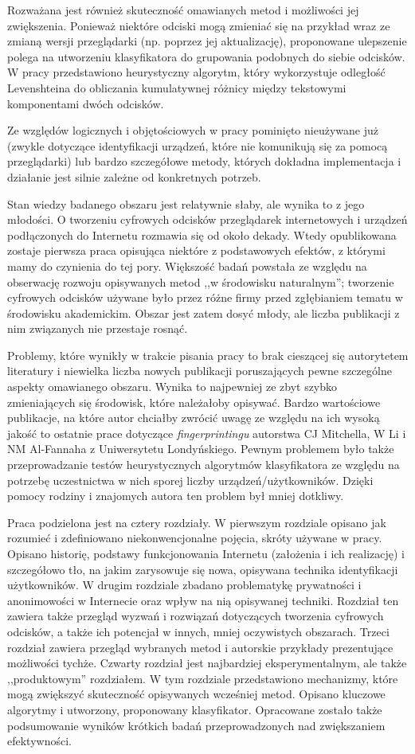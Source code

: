 Rozważana jest również skuteczność omawianych metod i możliwości jej
zwiększenia. Ponieważ niektóre odciski mogą zmieniać się na przykład wraz ze
zmianą wersji przeglądarki (np. poprzez jej aktualizację), proponowane
ulepszenie polega na utworzeniu klasyfikatora do grupowania podobnych do siebie
odcisków. W pracy przedstawiono heurystyczny algorytm, który wykorzystuje
odległość Levenshteina do obliczania kumulatywnej różnicy między tekstowymi
komponentami dwóch odcisków.

Ze względów logicznych i objętościowych w pracy pominięto nieużywane już (zwykle
dotyczące identyfikacji urządzeń, które nie komunikują się za pomocą
przeglądarki) lub bardzo szczegółowe metody, których dokładna implementacja i
działanie jest silnie zależne od konkretnych potrzeb.

Stan wiedzy badanego obszaru jest relatywnie słaby, ale wynika to z jego
młodości. O tworzeniu cyfrowych odcisków przeglądarek internetowych i urządzeń
podłączonych do Internetu rozmawia się od około dekady. Wtedy opublikowana
zostaje pierwsza praca opisująca niektóre z podstawowych efektów, z którymi mamy
do czynienia do tej pory. Większość badań powstała ze względu na obserwację
rozwoju opisywanych metod ,,w środowisku naturalnym''; tworzenie cyfrowych
odcisków używane było przez różne firmy przed zgłębianiem tematu w środowisku
akademickim. Obszar jest zatem dosyć młody, ale liczba publikacji z nim
związanych nie przestaje rosnąć.

Problemy, które wynikły w trakcie pisania pracy to brak cieszącej się
autorytetem literatury i niewielka liczba nowych publikacji poruszających pewne
szczególne aspekty omawianego obszaru. Wynika to najpewniej ze zbyt szybko
zmieniających się środowisk, które należałoby opisywać. Bardzo wartościowe
publikacje, na które autor chciałby zwrócić uwagę ze względu na ich wysoką
jakość to ostatnie prace dotyczące \emph{fingerprintingu} autorstwa CJ
Mitchella, W Li i NM Al-Fannaha z Uniwersytetu Londyńskiego. Pewnym problemem
było także przeprowadzanie testów heurystycznych algorytmów klasyfikatora ze
względu na potrzebę uczestnictwa w nich sporej liczby urządzeń/użytkowników.
Dzięki pomocy rodziny i znajomych autora ten problem był mniej dotkliwy.

Praca podzielona jest na cztery rozdziały. W pierwszym rozdziale opisano jak
rozumieć i zdefiniowano niekonwencjonalne pojęcia, skróty używane w pracy.
Opisano historię, podstawy funkcjonowania Internetu (założenia i ich realizację)
i szczegółowo tło, na jakim zarysowuje się nowa, opisywana technika
identyfikacji użytkowników. W drugim rozdziale zbadano problematykę prywatności
i anonimowości w Internecie oraz wpływ na nią opisywanej techniki. Rozdział ten
zawiera także przegląd wyzwań i rozwiązań dotyczących tworzenia cyfrowych
odcisków, a także ich potencjał w innych, mniej oczywistych obszarach. Trzeci
rozdział zawiera przegląd wybranych metod i autorskie przykłady prezentujące
możliwości tychże. Czwarty rozdział jest najbardziej eksperymentalnym, ale także
,,produktowym'' rozdziałem. W tym rozdziale przedstawiono mechanizmy, które mogą
zwiększyć skuteczność opisywanych wcześniej metod. Opisano kluczowe algorytmy i
utworzony, proponowany klasyfikator. Opracowane zostało także podsumowanie
wyników krótkich badań przeprowadzonych nad zwiększaniem efektywności.
